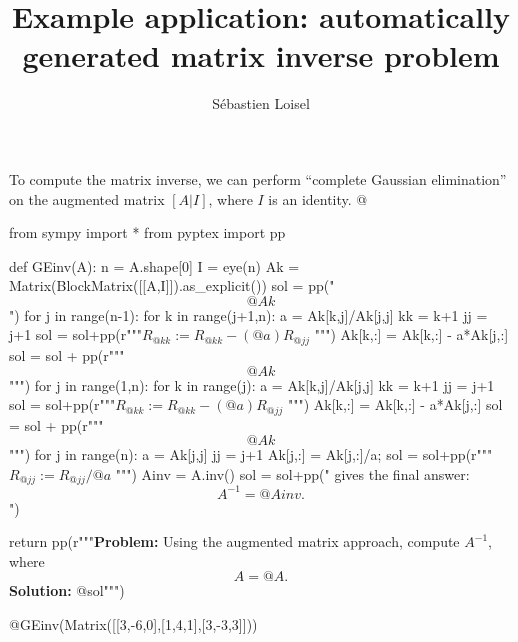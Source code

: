 \documentclass{article}
\author{Sébastien Loisel}
\title{Example application: automatically generated matrix inverse problem}
\date{}
\begin{document}
\maketitle

To compute the matrix inverse, we can perform ``complete Gaussian elimination'' on the augmented matrix $[A|I]$, where $I$ is an identity.
@{{{
from sympy import *
from pyptex import pp

def GEinv(A):
    n = A.shape[0]
    I = eye(n)
    Ak = Matrix(BlockMatrix([[A,I]]).as_explicit())
    sol = pp("$$@Ak$$\n")
    for j in range(n-1):
        for k in range(j+1,n):
             a = Ak[k,j]/Ak[j,j]
             kk = k+1
             jj = j+1
             sol = sol+pp(r"""$R_{@kk} := R_{@kk} - (@a) R_{@jj}$ """)
             Ak[k,:] = Ak[k,:] - a*Ak[j,:]
        sol = sol + pp(r"""$$@Ak$$""")
    for j in range(1,n):
        for k in range(j):
            a = Ak[k,j]/Ak[j,j]
            kk = k+1
            jj = j+1
            sol = sol+pp(r"""$R_{@kk} := R_{@kk} - (@a) R_{@jj}$ """)
            Ak[k,:] = Ak[k,:] - a*Ak[j,:]
        sol = sol + pp(r"""$$@Ak$$""")
    for j in range(n):
        a = Ak[j,j]
        jj = j+1
        Ak[j,:] = Ak[j,:]/a;
        sol = sol+pp(r"""$R_{@jj} := R_{@jj}/@a$ """)
    Ainv = A.inv()
    sol = sol+pp(" gives the final answer:\n$$A^{-1} = @Ainv.$$\n")
            
    return pp(r"""{\bf Problem:} Using the augmented matrix approach, 
    compute $A^{-1}$, where $$A = @A.$$ 
    {\bf Solution:} 
    @sol""")
}}}

@{GEinv(Matrix([[3,-6,0],[1,4,1],[3,-3,3]]))}
\end{document}
